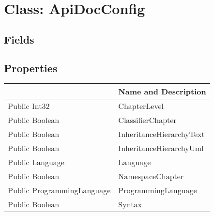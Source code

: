 \documentclass[11pt, oneside, a4paper]{book}
\begin{document}
\hypertarget{SoftwareEngineeringTools.{}Documentation.{}ApiDocConfig}{}
\section{Class: ApiDocConfig}

\subsection{Fields}

\subsection{Properties}
\begin{center}
\begin{tabular}{| p{3cm} | p{12cm} | }
\hline
\textbf{ } & \textbf{ Name and Description}\\
\hline
 Public  Int32 &  ChapterLevel\hypertarget{SoftwareEngineeringTools.{}Documentation.{}ApiDocConfig.{}ChapterLevel}{}\\
\hline
 Public  Boolean &  ClassifierChapter\hypertarget{SoftwareEngineeringTools.{}Documentation.{}ApiDocConfig.{}ClassifierChapter}{}\\
\hline
 Public  Boolean &  InheritanceHierarchyText\hypertarget{SoftwareEngineeringTools.{}Documentation.{}ApiDocConfig.{}InheritanceHierarchyText}{}\\
\hline
 Public  Boolean &  InheritanceHierarchyUml\hypertarget{SoftwareEngineeringTools.{}Documentation.{}ApiDocConfig.{}InheritanceHierarchyUml}{}\\
\hline
 Public  Language &  Language\hypertarget{SoftwareEngineeringTools.{}Documentation.{}ApiDocConfig.{}Language}{}\\
\hline
 Public  Boolean &  NamespaceChapter\hypertarget{SoftwareEngineeringTools.{}Documentation.{}ApiDocConfig.{}NamespaceChapter}{}\\
\hline
 Public  ProgrammingLanguage &  ProgrammingLanguage\hypertarget{SoftwareEngineeringTools.{}Documentation.{}ApiDocConfig.{}ProgrammingLanguage}{}\\
\hline
 Public  Boolean &  Syntax\hypertarget{SoftwareEngineeringTools.{}Documentation.{}ApiDocConfig.{}Syntax}{}\\
\hline
\end{tabular}
\end{center}
\end{document}
